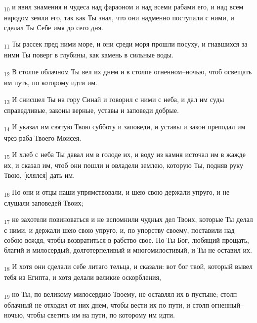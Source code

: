 \begin{tcolorbox}
\textsubscript{10} и явил знамения и чудеса над фараоном и над всеми рабами его, и над всем народом земли его, так как Ты знал, что они надменно поступали с ними, и сделал Ты Себе имя до сего дня.
\end{tcolorbox}
\begin{tcolorbox}
\textsubscript{11} Ты рассек пред ними море, и они среди моря прошли посуху, и гнавшихся за ними Ты поверг в глубины, как камень в сильные воды.
\end{tcolorbox}
\begin{tcolorbox}
\textsubscript{12} В столпе облачном Ты вел их днем и в столпе огненном--ночью, чтоб освещать им путь, по которому идти им.
\end{tcolorbox}
\begin{tcolorbox}
\textsubscript{13} И снисшел Ты на гору Синай и говорил с ними с неба, и дал им суды справедливые, законы верные, уставы и заповеди добрые.
\end{tcolorbox}
\begin{tcolorbox}
\textsubscript{14} И указал им святую Твою субботу и заповеди, и уставы и закон преподал им чрез раба Твоего Моисея.
\end{tcolorbox}
\begin{tcolorbox}
\textsubscript{15} И хлеб с неба Ты давал им в голоде их, и воду из камня источал им в жажде их, и сказал им, чтоб они пошли и овладели землею, которую Ты, подняв руку Твою, [клялся] дать им.
\end{tcolorbox}
\begin{tcolorbox}
\textsubscript{16} Но они и отцы наши упрямствовали, и шею свою держали упруго, и не слушали заповедей Твоих;
\end{tcolorbox}
\begin{tcolorbox}
\textsubscript{17} не захотели повиноваться и не вспомнили чудных дел Твоих, которые Ты делал с ними, и держали шею свою упруго, и, по упорству своему, поставили над собою вождя, чтобы возвратиться в рабство свое. Но Ты Бог, любящий прощать, благий и милосердый, долготерпеливый и многомилостивый, и Ты не оставил их.
\end{tcolorbox}
\begin{tcolorbox}
\textsubscript{18} И хотя они сделали себе литаго тельца, и сказали: вот бог твой, который вывел тебя из Египта, и хотя делали великие оскорбления,
\end{tcolorbox}
\begin{tcolorbox}
\textsubscript{19} но Ты, по великому милосердию Твоему, не оставлял их в пустыне; столп облачный не отходил от них днем, чтобы вести их по пути, и столп огненный--ночью, чтобы светить им на пути, по которому им идти.
\end{tcolorbox}
